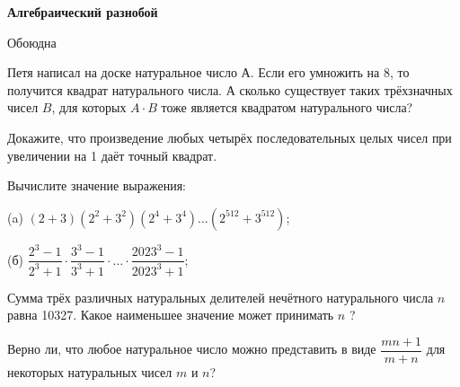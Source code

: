 \centerline{\bf \Huge Алгебраический разнобой}
\centerline{\bf \Huge }

\begin{flushright}
    \scriptsize{Обоюдна}
\end{flushright}

Петя написал на доске натуральное число А. Если его умножить на 8, то получится квадрат натурального числа. А сколько существует таких трёхзначных чисел $B$, для которых $A \cdot B$ тоже является квадратом натурального числа?

Докажите, что произведение любых четырёх последовательных целых чисел при увеличении на 1 даёт точный квадрат.

Вычислите значение выражения:

(a) $(2+3)\left(2^2+3^2\right)\left(2^4+3^4\right) \ldots\left(2^{512}+3^{512}\right)$;

(б) $\dfrac{2^3-1}{2^3+1} \cdot \dfrac{3^3-1}{3^3+1} \cdot \ldots \cdot \dfrac{2023^3-1}{2023^3+1}$;

Сумма трёх различных натуральных делителей нечётного натурального числа $n$ равна 10327. Какое наименьшее значение может принимать $n$ ?

Верно ли, что любое натуральное число можно представить в виде $\dfrac{m n+1}{m+n}$ для некоторых натуральных чисел $m$ и $n$?
